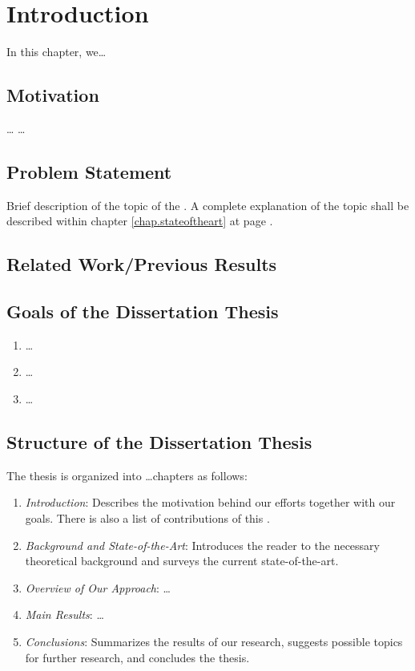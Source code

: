 \chapter{Introduction}

\begin{chapterintro}
    In this chapter, we\dots
\end{chapterintro}


\section{Motivation}
\dots \cite{YOURPUBL-MINIMUM} \dots

\section{Problem Statement}
Brief description of the topic of the \thesis. A complete explanation of the topic shall be described within chapter \ref{chap.stateoftheart} at page \pageref{chap.stateoftheart}.

\section{Related Work/Previous Results}


\section{Goals of the Dissertation Thesis}
%
%
\begin{enumerate}
\item
\dots

\item
\dots

\item
\dots
\end{enumerate}

\section{Structure of the Dissertation Thesis}
The thesis is organized into \dots chapters as follows:
\begin{enumerate}
\item \emph{Introduction}: Describes the motivation behind our efforts together with our goals. There is also a list of contributions of this \thesis. 

\item \emph{Background and State-of-the-Art}: Introduces the reader to the necessary theoretical background and surveys the current state-of-the-art.

\item \emph{Overview of Our Approach}: \dots

\item \emph{Main Results}: \dots

\item \emph{Conclusions}: Summarizes the results of our research, suggests possible topics for further research, and concludes the thesis.
\end{enumerate}
